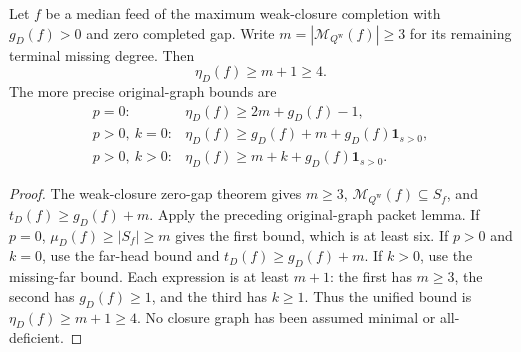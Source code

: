 \begin{theorem}
\label{thm:minimal-weak-zero-feed-residual-four}
Let $f$ be a median feed of the maximum weak-closure completion
with $g_D(f)>0$ and zero completed gap. Write
$m=|\mathcal M_{Q^{\mathrm w}}(f)|\ge3$ for its remaining terminal
missing degree. Then
\[
 \eta_D(f)\ge m+1\ge4.
\]
The more precise original-graph bounds are
\[
 \begin{array}{ll}
 p=0:&\eta_D(f)\ge2m+g_D(f)-1,\\
 p>0,\ k=0:&\eta_D(f)\ge g_D(f)+m+g_D(f)\mathbf1_{s>0},\\
 p>0,\ k>0:&\eta_D(f)\ge m+k+g_D(f)\mathbf1_{s>0}.
 \end{array}
\]
\end{theorem}
\begin{proof}
The weak-closure zero-gap theorem gives $m\ge3$,
$\mathcal M_{Q^{\mathrm w}}(f)\subseteq S_f$, and
$t_D(f)\ge g_D(f)+m$. Apply the preceding original-graph packet
lemma. If $p=0$, $\mu_D(f)\ge|S_f|\ge m$ gives the first bound,
which is at least six. If $p>0$ and $k=0$, use the far-head bound
and $t_D(f)\ge g_D(f)+m$. If $k>0$, use the missing-far bound.
Each expression is at least $m+1$: the first has $m\ge3$, the
second has $g_D(f)\ge1$, and the third has $k\ge1$.
Thus the unified bound is $\eta_D(f)\ge m+1\ge4$.
No closure graph has been assumed minimal or all-deficient.
\end{proof}

